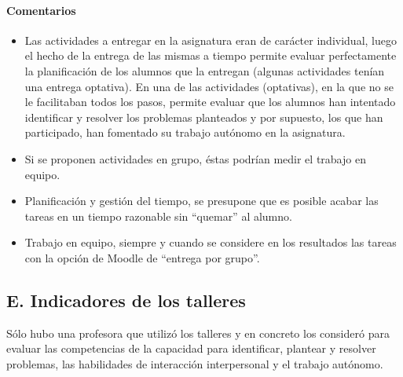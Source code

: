 \paragraph*{Comentarios}

\begin{itemize}
\item Las actividades a entregar en la asignatura eran de carácter individual, luego el hecho de la entrega de las mismas a tiempo permite evaluar perfectamente la planificación de los alumnos que la entregan (algunas actividades tenían una entrega optativa). En una de las actividades (optativas), en la que no se le facilitaban todos los pasos, permite evaluar que los alumnos han intentado identificar y resolver los problemas planteados y por supuesto, los que han participado, han fomentado su trabajo autónomo en la asignatura.
\item Si se proponen actividades en grupo, éstas podrían medir el trabajo en equipo.
\item Planificación y gestión del tiempo, se presupone que es posible acabar las tareas en un tiempo razonable sin ``quemar'' al alumno.
\item Trabajo en equipo, siempre y cuando se considere en los resultados las tareas con la opción de Moodle de ``entrega por grupo''. 
\end{itemize}

	\subsection*{E. Indicadores de los talleres}

Sólo hubo una profesora que utilizó los talleres y en concreto los consideró para evaluar las competencias de la capacidad para  identificar, plantear y resolver problemas, las habilidades de interacción interpersonal y el trabajo autónomo.
